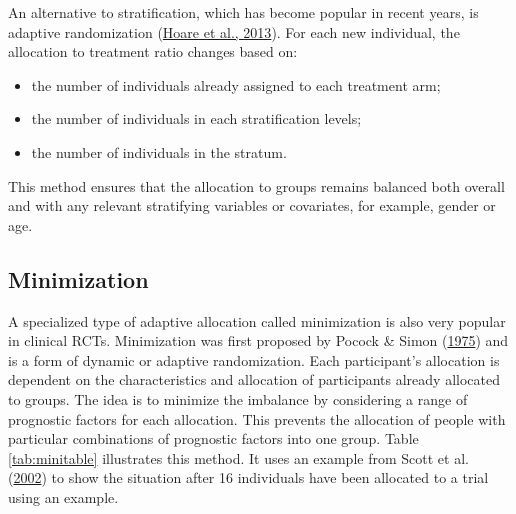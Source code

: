 \documentclass{krantz}
\providecommand{\tightlist}{%
\setlength{\itemsep}{0pt}\setlength{\parskip}{0pt}}
\begin{document}
An alternative to stratification, which has become popular in recent years, is adaptive randomization (\protect\hyperlink{ref-hoare2013}{Hoare et al., 2013}). For each new individual, the allocation to treatment ratio changes based on:

\begin{itemize}
\tightlist
\item
  the number of individuals already assigned to each treatment arm;
\item
  the number of individuals in each stratification levels;
\item
  the number of individuals in the stratum.
\end{itemize}

This method ensures that the allocation to groups remains balanced both overall and with any relevant stratifying variables or covariates, for example, gender or age.

\hypertarget{minimization}{%
\subsection{Minimization}\label{minimization}}

A specialized type of adaptive allocation called minimization is also very popular in clinical RCTs. Minimization was first proposed by Pocock \& Simon (\protect\hyperlink{ref-pocock1975}{1975}) and is a form of dynamic or adaptive randomization. Each participant's allocation is dependent on the characteristics and allocation of participants already allocated to groups. The idea is to minimize the imbalance by considering a range of prognostic factors for each allocation. This prevents the allocation of people with particular combinations of prognostic factors into one group. Table \ref{tab:minitable} illustrates this method. It uses an example from Scott et al. (\protect\hyperlink{ref-scott2002}{2002}) to show the situation after 16 individuals have been allocated to a trial using an example.
\end{document}
